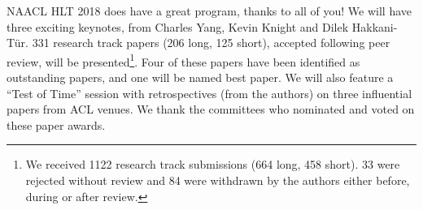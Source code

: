 NAACL HLT 2018 does have a great program, thanks to all of you! 
We will have three exciting keynotes, from Charles Yang, Kevin Knight and Dilek Hakkani-T\"ur. 
331 research track papers (206 long, 125 short), accepted following peer review, will be presented\footnote{We received 1122 research track submissions (664 long, 458 short). 33 were rejected without review and 84 were withdrawn by the authors either before, during or after review.}. Four of these papers have been identified as outstanding papers, and one will be named best paper. 
We will also feature a ``Test of Time'' session with retrospectives (from the authors) on three influential papers from ACL venues. We thank the committees who nominated and voted on these paper awards.
